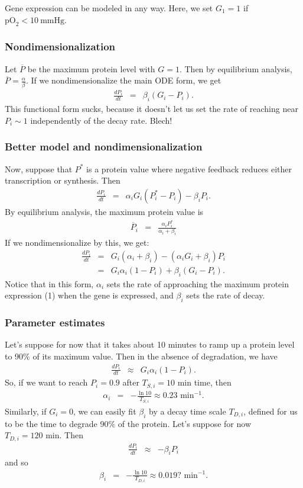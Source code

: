\documentclass[12pt]{article}
\newcommand{\oxy}{  {\textrm{pO}_2} }
\newcommand{\mmHg}{\: \textrm{mmHg} }
\newcommand{\beqa}{\begin{eqnarray}}
\newcommand{\eeqa}{\end{eqnarray}}
\begin{document}
Gene expression can be modeled in any way. Here, we set $G_1 =1$ if $\oxy < 10 \mmHg$. 

\subsubsection{Nondimensionalization}
Let $\overline{P}$ be the maximum protein level with $G = 1$. Then by equilibrium analysis, 
$\overline{P} = \frac{\alpha}{\beta}$. If we nondimensionalize the main ODE form, we get 
\beqa
\frac{dP_i}{dt} & = & \beta_i \left( G_i - P_i \right). 
\eeqa
This functional form sucks, because it doesn't let us set the rate of reaching near $P_i \sim 1$ independently 
of the decay rate. Blech!

\subsubsection{Better model and nondimensionalization}
Now, suppose that $P^*$ is a protein value where negative feedback reduces either transcription or synthesis. Then 
\beqa
\frac{ dP_i }{dt } & = & \alpha_i G_i \left( P_i^* - P_i \right) - \beta_i P_i. 
\eeqa
By equilibrium analysis, the maximum protein value is 
\beqa
\overline{P}_i & =& 
\frac{\alpha_i P_i^*}{\alpha_i + \beta_i }
\eeqa
If we nondimensionalize by this, we get: 
\beqa
\frac{ dP_i }{dt} & = & 
G_i \left( \alpha_i + \beta_i \right) - \left( \alpha_i G_i + \beta_i \right) P_i \nonumber \\
& = & 
G_i \alpha_i \left( 1 - P_i \right) + \beta_i \left( G_i - P_i \right) . 
\eeqa
Notice that in this form, $\alpha_i$ sets the rate of approaching the maximum protein expression (1) 
when the gene is expressed, and $\beta_i$ sets the rate of decay. 

\subsubsection{Parameter estimates}
Let's suppose for now that it takes about 10 minutes to ramp up a protein level to 90\% of its 
maximum value. Then in the absence of degradation, we have 
\beqa
\frac{dP_i}{dt} & \approx & G_i \alpha_i \left( 1 - P_i \right). 
\eeqa
So, if we want to reach $P_i = 0.9$ after $T_{S,i} = 10 \textrm{ min}$ time, then 
\beqa
\alpha_i &  =&  -\frac{ \ln{10} }{ T_{S,i} } \approx 0.23  \textrm{ min}^{-1}. 
\eeqa
Similarly, if $G_i = 0$, we can easily fit $\beta_i$ by a decay time scale $T_{D,i}$, defined 
for us to be the time to degrade 90\% of the protein. Let's suppose for now $T_{D,i} = 120 \textrm{ min}$. 
Then 
\beqa
\frac{dP_i}{dt} & \approx & - \beta_i  P_i  
\eeqa
and so 
\beqa
\beta_i & = & -\frac{ \ln{10} }{ T_{D,i} } \approx 0.019 ? \textrm{ min}^{-1}. 
\eeqa
\end{document}
